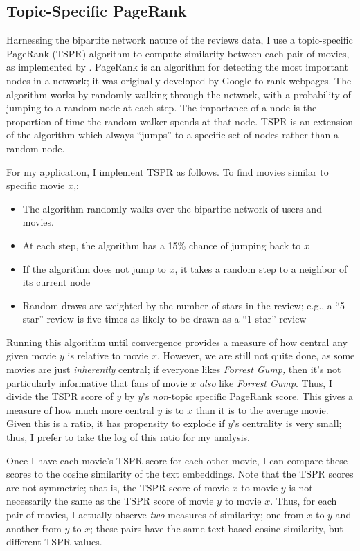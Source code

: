 \documentclass{article}
\begin{document}
\subsection{Topic-Specific PageRank}

Harnessing the bipartite network nature of the reviews data, I use a topic-specific PageRank (TSPR) algorithm to compute similarity between each pair of movies, as implemented by \textcite{sajani2023}. PageRank is an algorithm for detecting the most important nodes in a network; it was originally developed by Google to rank webpages. The algorithm works by randomly walking through the network, with a probability of jumping to a random node at each step. The importance of a node is the proportion of time the random walker spends at that node. TSPR is an extension of the algorithm which always ``jumps'' to a specific set of nodes rather than a random node.

For my application, I implement TSPR as follows. To find movies similar to specific movie $x$,:
\begin{itemize}
    \item The algorithm randomly walks over the bipartite network of users and movies. 
    \item At each step, the algorithm has a 15\% chance of jumping back to $x$
    \item If the algorithm does not jump to $x$, it takes a random step to a neighbor of its current node
    \item Random draws are weighted by the number of stars in the review; e.g., a ``5-star'' review is five times as likely to be drawn as a ``1-star'' review
\end{itemize}

Running this algorithm until convergence provides a measure of how central any given movie $y$ is relative to movie $x$. However, we are still not quite done, as some movies are just \emph{inherently} central; if everyone likes \emph{Forrest Gump,} then it's not particularly informative that fans of movie $x$ \emph{also} like \emph{Forrest Gump}. Thus, I divide the TSPR score of $y$ by $y$'s \emph{non}-topic specific PageRank score. This gives a measure of how much more central $y$ is to $x$ than it is to the average movie. Given this is a ratio, it has propensity to explode if $y$'s centrality is very small; thus, I prefer to take the log of this ratio for my analysis.

Once I have each movie's TSPR score for each other movie, I can compare these scores to the cosine similarity of the text embeddings. Note that the TSPR scores are not symmetric; that is, the TSPR score of movie $x$ to movie $y$ is not necessarily the same as the TSPR score of movie $y$ to movie $x$. Thus, for each pair of movies, I actually observe \emph{two} measures of similarity; one from $x$ to $y$ and another from $y$ to $x$; these pairs have the same text-based cosine similarity, but different TSPR values. 
\end{document}
